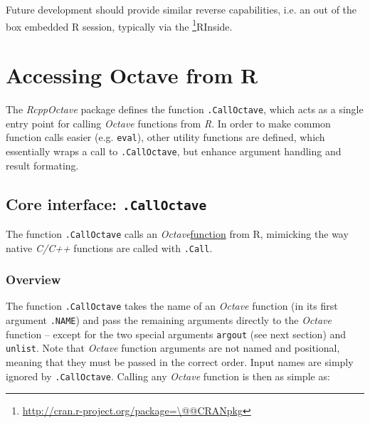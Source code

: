 \documentclass[english,10pt,a4paper]{article}\usepackage{graphicx, color}
\makeatletter
\let\proglang=\textit
\let\code=\texttt
\newcommand{\pkgname}[1]{\textit{#1}\xspace}
\newcommand{\Rpkg}[1]{\pkgname{#1} package\xspace}
\newcommand{\CRANurl}[1]{\url{http://cran.r-project.org/package=#1}}
\def\CRANpkg{\@ifstar\@CRANpkg\@@CRANpkg}
\def\@CRANpkg#1{\href{http://cran.r-project.org/package=#1}{\pkgname{#1}}\footnote{\CRANurl{#1}}}
\def\@@CRANpkg#1{\href{http://cran.r-project.org/package=#1}{\pkgname{#1}} package\footnote{\CRANurl{#1}}}
\newcommand{\octave}{\proglang{Octave}\xspace}
\makeatother
\begin{document}
Future development should provide similar reverse capabilities, i.e. an out
of the box embedded R session, typically via the \CRANpkg{RInside}.

\section{Accessing Octave from R}

The \Rpkg{RcppOctave} defines the function \code{.CallOctave}, which acts as a
single entry point for calling \octave functions from \proglang{R}.
In order to make common function calls easier (e.g. \code{eval}), other utility
functions are defined, which essentially wraps a call to \code{.CallOctave}, but
enhance argument handling and result formating.

\subsection{Core interface: \texttt{.CallOctave}}
The function \code{.CallOctave} calls an \octave \underline{function}
from R, mimicking the way native \proglang{C/C++} functions are called with
\code{.Call}.

\subsubsection{Overview}

The function \code{.CallOctave} takes the name of an \octave function (in its
first argument \code{.NAME}) and pass the remaining arguments directly to the
\octave function -- except for the two special arguments \code{argout} (see next
section) and \code{unlist}.
Note that \octave function arguments are not named and positional, meaning that
they must be passed in the correct order.
Input names are simply ignored by \code{.CallOctave}.
Calling any \octave function is then as simple as: 
\end{document}
